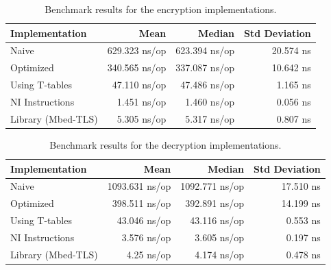 \begin{table}[H]
    \caption{Benchmark results for the encryption implementations.}
    \label{benchmark_encryption_table}
    \begin{center}
        \begin{tabular}{|l|r|r|r|}
            \hline
                \textbf{Implementation} &
                \textbf{Mean} &
                \textbf{Median} &
                \textbf{Std Deviation} \\ [0.5ex]
            \hline\hline
                Naive &
                629.323 ns/op &
                623.394 ns/op &
                20.574 ns \\
            \hline
                Optimized &
                340.565 ns/op &
                337.087 ns/op &
                10.642 ns \\
            \hline
                Using T-tables &
                47.110 ns/op &
                47.486 ns/op &
                1.165 ns \\
            \hline
                NI Instructions &
                1.451 ns/op &
                1.460 ns/op &
                0.056 ns \\
            \hline
                Library (Mbed-TLS) &
                5.305 ns/op &
                5.317 ns/op &
                0.807 ns \\
            \hline
        \end{tabular}
    \end{center}
\end{table}

\begin{table}[H]
    \caption{Benchmark results for the decryption implementations.}
    \label{benchmark_decryption_table}
    \begin{center}
        \begin{tabular}{|l|r|r|r|}
            \hline
                \textbf{Implementation} &
                \textbf{Mean} &
                \textbf{Median} &
                \textbf{Std Deviation} \\ [0.5ex]
            \hline\hline
                Naive &
                1093.631 ns/op &
                1092.771 ns/op &
                17.510 ns \\
            \hline
                Optimized &
                398.511 ns/op &
                392.891 ns/op &
                14.199 ns \\
            \hline
                Using T-tables &
                43.046 ns/op &
                43.116 ns/op &
                0.553 ns \\
            \hline
                NI Instructions &
                3.576 ns/op &
                3.605 ns/op &
                0.197 ns \\
            \hline
                Library (Mbed-TLS) &
                4.25 ns/op &
                4.174 ns/op &
                0.478 ns \\
            \hline
        \end{tabular}
    \end{center}
\end{table}

